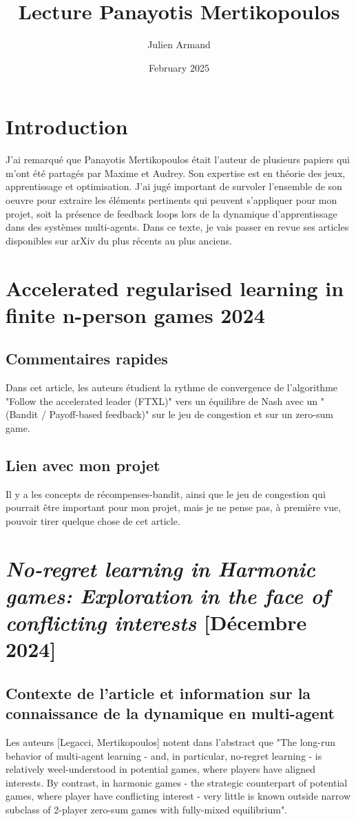 \documentclass{article}
\title{Lecture Panayotis Mertikopoulos}
\author{Julien Armand}
\date{February 2025}
\begin{document}
\maketitle

\section{Introduction}
J'ai remarqué que Panayotis Mertikopoulos était l'auteur de plusieurs papiers qui m'ont été partagés par Maxime et Audrey.  Son expertise est en théorie des jeux, apprentissage et optimisation.  J'ai jugé important de survoler l'ensemble de son oeuvre pour extraire les éléments pertinents qui peuvent s'appliquer pour mon projet, soit la présence de feedback loops lors de la dynamique d'apprentissage dans des systèmes multi-agents. Dans ce texte, je vais passer en revue ses articles disponibles sur arXiv du plus récents au plus anciens.

\section{Accelerated regularised learning in finite n-person games \cite{lotidis_accelerated_2024} 2024}
\subsection{Commentaires rapides}
Dans cet article, les auteurs étudient la rythme de convergence de l'algorithme "Follow the accelerated leader (FTXL)" vers un équilibre de Nash avec un "(Bandit / Payoff-based feedback)" sur le jeu de congestion et sur un zero-sum game.
\subsection{Lien avec mon projet}
Il y a les concepts de récompenses-bandit, ainsi que le jeu de congestion qui pourrait être important pour mon projet, mais je ne pense pas, à première vue, pouvoir tirer quelque chose de cet article. 

\section{\textit{No-regret learning in Harmonic games: Exploration in the face of conflicting interests }\cite{legacci_no-regret_2024} [Décembre 2024]}

\subsection{Contexte de l'article et information sur la connaissance de la dynamique en multi-agent}
 Les auteurs [Legacci, Mertikopoulos] notent dans l'abstract que "The long-run behavior of multi-agent learning - and, in particular, no-regret learning - is relatively weel-understood in potential games, where players have aligned interests. By contrast, in harmonic games - the strategic counterpart of potential games, where player have conflicting interest - very little is known outside narrow subclass of 2-player zero-sum games with fully-mixed equilibrium".
 \\
 \\
 
\end{document}
